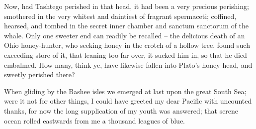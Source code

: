 \documentclass{article}
\begin{document}
      Now, had Tashtego perished in that head, it had been a very precious perishing; smothered in the very whitest and daintiest of fragrant spermaceti; coffined, hearsed, and tombed in the secret inner chamber and sanctum sanctorum of the whale. Only one sweeter end can readily be recalled -- the delicious death of an Ohio honey-hunter, who seeking honey in the crotch of a hollow tree, found such exceeding store of it, that leaning too far over, it sucked him in, so that he died embalmed. How many, think ye, have likewise fallen into Plato's honey head, and sweetly perished there? 


 When gliding by the Bashee isles we emerged at last upon the great South Sea; were it not for other things, I could have greeted my dear Pacific with uncounted thanks, for now the long supplication of my youth was answered; that serene ocean rolled eastwards from me a thousand leagues of blue.
\end{document}
